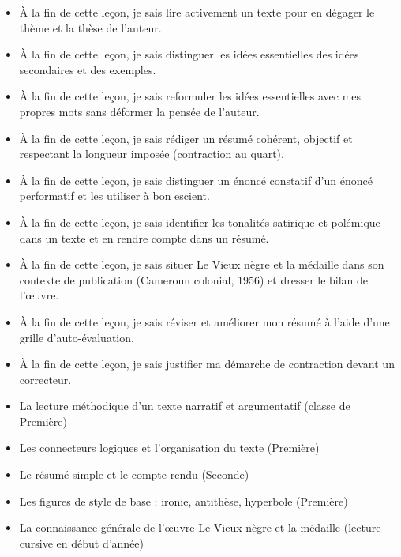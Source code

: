 \documentclass[11pt]{article}
\begin{document}
\begin{objectifs}
\begin{itemize}
\item À la fin de cette leçon, je sais lire activement un texte pour en dégager le thème et la thèse de l'auteur.
\item À la fin de cette leçon, je sais distinguer les idées essentielles des idées secondaires et des exemples.
\item À la fin de cette leçon, je sais reformuler les idées essentielles avec mes propres mots sans déformer la pensée de l'auteur.
\item À la fin de cette leçon, je sais rédiger un résumé cohérent, objectif et respectant la longueur imposée (contraction au quart).
\item À la fin de cette leçon, je sais distinguer un énoncé constatif d'un énoncé performatif et les utiliser à bon escient.
\item À la fin de cette leçon, je sais identifier les tonalités satirique et polémique dans un texte et en rendre compte dans un résumé.
\item À la fin de cette leçon, je sais situer Le Vieux nègre et la médaille dans son contexte de publication (Cameroun colonial, 1956) et dresser le bilan de l'œuvre.
\item À la fin de cette leçon, je sais réviser et améliorer mon résumé à l'aide d'une grille d'auto-évaluation.
\item À la fin de cette leçon, je sais justifier ma démarche de contraction devant un correcteur.
\end{itemize}
\end{objectifs}

\begin{prerequis}
\begin{itemize}
\item La lecture méthodique d'un texte narratif et argumentatif (classe de Première)
\item Les connecteurs logiques et l'organisation du texte (Première)
\item Le résumé simple et le compte rendu (Seconde)
\item Les figures de style de base : ironie, antithèse, hyperbole (Première)
\item La connaissance générale de l'œuvre Le Vieux nègre et la médaille (lecture cursive en début d'année)
\end{itemize}
\end{prerequis}
\end{document}
